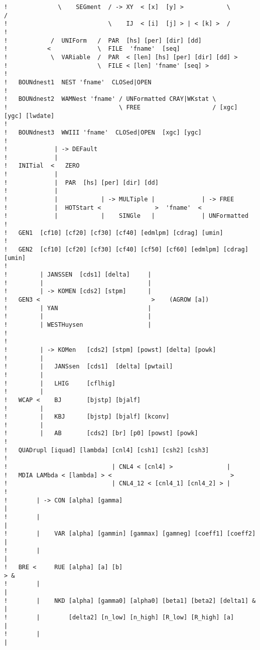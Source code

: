 \documentclass[12pt]{book}
\begin{document}
\begin{verbatim}
!              \    SEGment  / -> XY  < [x]  [y] >            \          /
!                            \    IJ  < [i]  [j] > | < [k] >  /
!
!            /  UNIForm   /  PAR  [hs] [per] [dir] [dd]
!           <             \  FILE  'fname'  [seq]
!            \  VARiable  /  PAR  < [len] [hs] [per] [dir] [dd] >
!                         \  FILE < [len] 'fname' [seq] >
!
!   BOUNdnest1  NEST 'fname'  CLOSed|OPEN
!
!   BOUNdnest2  WAMNest 'fname' / UNFormatted CRAY|WKstat \
!                               \ FREE                    / [xgc] [ygc] [lwdate]
!
!   BOUNdnest3  WWIII 'fname'  CLOSed|OPEN  [xgc] [ygc]
!
!             | -> DEFault
!             |
!   INITial  <   ZERO
!             |
!             |  PAR  [hs] [per] [dir] [dd]
!             |
!             |            | -> MULTiple |             | -> FREE
!             |  HOTStart <               >  'fname'  <
!             |            |    SINGle   |             | UNFormatted
!
!   GEN1  [cf10] [cf20] [cf30] [cf40] [edmlpm] [cdrag] [umin]
!
!   GEN2  [cf10] [cf20] [cf30] [cf40] [cf50] [cf60] [edmlpm] [cdrag] [umin]
!
!         | JANSSEN  [cds1] [delta]     |
!         |                             |
!         | -> KOMEN [cds2] [stpm]      |
!   GEN3 <                               >    (AGROW [a])
!         | YAN                         |
!         |                             |
!         | WESTHuysen                  |
!
!
!         | -> KOMen   [cds2] [stpm] [powst] [delta] [powk]
!         |
!         |   JANSsen  [cds1]  [delta] [pwtail]
!         |
!         |   LHIG     [cflhig]
!         |
!   WCAP <    BJ       [bjstp] [bjalf]
!         |
!         |   KBJ      [bjstp] [bjalf] [kconv]
!         |
!         |   AB       [cds2] [br] [p0] [powst] [powk]
!
!   QUADrupl [iquad] [lambda] [cnl4] [csh1] [csh2] [csh3]
!
!                             | CNL4 < [cnl4] >               |
!   MDIA LAMbda < [lambda] > <                                 >
!                             | CNL4_12 < [cnl4_1] [cnl4_2] > |
!
!        | -> CON [alpha] [gamma]                                      |
!        |                                                             |
!        |    VAR [alpha] [gammin] [gammax] [gamneg] [coeff1] [coeff2] |
!        |                                                             |
!   BRE <     RUE [alpha] [a] [b]                                       > &
!        |                                                             |
!        |    NKD [alpha] [gamma0] [alpha0] [beta1] [beta2] [delta1] & |
!        |        [delta2] [n_low] [n_high] [R_low] [R_high] [a]       |
!        |                                                             |

\end{verbatim}
\end{document}
